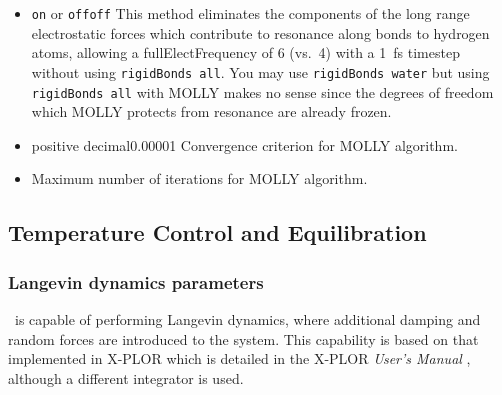 \begin{itemize}
\item
{}
{{\tt on} or {\tt off}}{{\tt off}}
{
This method eliminates the components of the long range electrostatic
forces which contribute to resonance along bonds to hydrogen atoms,
allowing a fullElectFrequency of 6 (vs.\ 4) with a 1~fs timestep
without using {\tt rigidBonds all}.  You may use {\tt rigidBonds water} but
using {\tt rigidBonds all} with MOLLY makes no sense since the degrees of
freedom which MOLLY protects from resonance are already frozen.
}

\item
{}
{positive decimal}{0.00001}
{
Convergence criterion for MOLLY algorithm.
}

\item
{}
{
Maximum number of iterations for MOLLY algorithm.
}

\end{itemize}


\subsection{Temperature Control and Equilibration}

\subsubsection{Langevin dynamics parameters}

\NAMD\ is capable
of performing Langevin dynamics, where additional damping and
random forces are introduced to the system.  This capability
is based on that implemented in X-PLOR which is detailed
in the X-PLOR {\it User's Manual} ,
although a different integrator is used.

